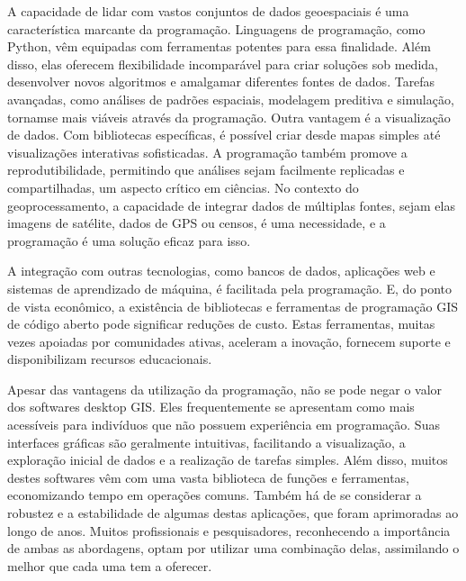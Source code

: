 \documentclass[letterpaper,10pt,english]{jupyterBook}
\begin{document}
\sphinxAtStartPar
A capacidade de lidar com vastos conjuntos de dados geoespaciais é uma característica marcante da programação. Linguagens de programação, como Python, vêm equipadas com ferramentas potentes para essa finalidade. Além disso, elas oferecem flexibilidade incomparável para criar soluções sob medida, desenvolver novos algoritmos e amalgamar diferentes fontes de dados. Tarefas avançadas, como análises de padrões espaciais, modelagem preditiva e simulação, tornam\sphinxhyphen{}se mais viáveis através da programação.
Outra vantagem é a visualização de dados. Com bibliotecas específicas, é possível criar desde mapas simples até visualizações interativas sofisticadas. A programação também promove a reprodutibilidade, permitindo que análises sejam facilmente replicadas e compartilhadas, um aspecto crítico em ciências. No contexto do geoprocessamento, a capacidade de integrar dados de múltiplas fontes, sejam elas imagens de satélite, dados de GPS ou censos, é uma necessidade, e a programação é uma solução eficaz para isso.

\sphinxAtStartPar
A integração com outras tecnologias, como bancos de dados, aplicações web e sistemas de aprendizado de máquina, é facilitada pela programação. E, do ponto de vista econômico, a existência de bibliotecas e ferramentas de programação GIS de código aberto pode significar reduções de custo. Estas ferramentas, muitas vezes apoiadas por comunidades ativas, aceleram a inovação, fornecem suporte e disponibilizam recursos educacionais.

\sphinxAtStartPar
Apesar das vantagens da utilização da programação, não se pode negar o valor dos softwares desktop GIS. Eles frequentemente se apresentam como mais acessíveis para indivíduos que não possuem experiência em programação. Suas interfaces gráficas são geralmente intuitivas, facilitando a visualização, a exploração inicial de dados e a realização de tarefas simples. Além disso, muitos destes softwares vêm com uma vasta biblioteca de funções e ferramentas, economizando tempo em operações comuns. Também há de se considerar a robustez e a estabilidade de algumas destas aplicações, que foram aprimoradas ao longo de anos. Muitos profissionais e pesquisadores, reconhecendo a importância de ambas as abordagens, optam por utilizar uma combinação delas, assimilando o melhor que cada uma tem a oferecer.
\end{document}
